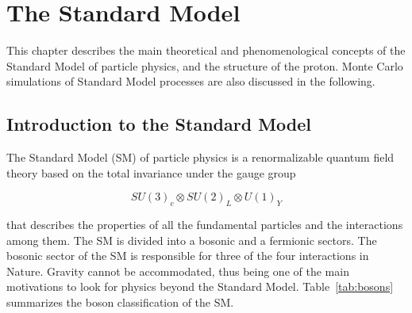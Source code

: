 \chapter{The Standard Model}
    \label{chapter:StandardModel}

This chapter describes the main theoretical and phenomenological concepts of the Standard Model of particle physics, and the structure of the proton.
Monte Carlo simulations of Standard Model processes are also discussed in the following.


\section{Introduction to the Standard Model}
    \label{sec:IntroSM}

The Standard Model (SM) of particle physics \cite{Glashow:1961tr, Weinberg:1967tq, Salam:1980jd} is a renormalizable quantum field theory based on the total invariance under the gauge group

\begin{equation}
SU(3)_{c}\otimes SU(2)_{L}\otimes U(1)_{Y}
\label{eq:SMSymmetryGroup}
\end{equation}

\noindent that describes the properties of all the fundamental particles and the interactions among them.
The SM is divided into a bosonic and a fermionic sectors.
The bosonic sector of the SM is responsible for three of the four interactions in Nature.
Gravity cannot be accommodated, thus being one of the main motivations to look for physics beyond the Standard Model.
Table~\ref{tab:bosons} summarizes the boson classification of the SM.


